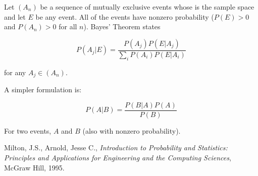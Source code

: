 \documentclass[12pt]{article}
\begin{document}

Let $(A_n)$ be a sequence of mutually exclusive events whose  is the sample space and let $E$ be any event.  All of the events have nonzero probability ($P(E) > 0$ and $P(A_n) > 0$ for all $n$).  Bayes' Theorem states

$$ P(A_j|E) = \frac{P(A_j)P(E|A_j)}{\sum_i P(A_i)P(E|A_i)} $$

for any $A_j \in (A_n)$.

A simpler formulation is:

$$ P(A|B) = \frac{P(B|A)P(A)}{P(B)} $$

For two events, $A$ and $B$ (also with nonzero probability).  

\begin{thebibliography}{3}
 Milton, J.S., Arnold, Jesse C., \textsl{Introduction to Probability and Statistics: Principles and Applications for Engineering and the Computing Sciences}, McGraw Hill, 1995.
\end{thebibliography}
\end{document}
